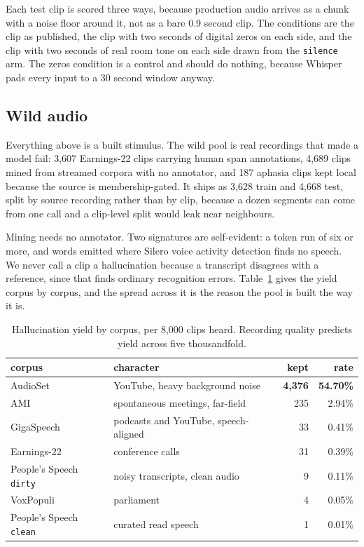 \documentclass[preprint]{article}
\begin{document}
Each test clip is scored three ways, because production audio arrives as a chunk with a noise
floor around it, not as a bare 0.9 second clip. The conditions are the clip as published, the
clip with two seconds of digital zeros on each side, and the clip with two seconds of real room
tone on each side drawn from the \texttt{silence} arm. The zeros condition is a control and
should do nothing, because Whisper pads every input to a 30 second window anyway.

\subsection{Wild audio}

Everything above is a built stimulus. The wild pool is real recordings that made a model fail:
3,607 Earnings-22 \citep{delrio2022earnings22} clips carrying human span annotations, 4,689
clips mined from streamed corpora with no annotator, and 187 aphasia clips kept local because
the source is membership-gated. It ships as 3,628 train and 4,668 test, split by source
recording rather than by clip, because a dozen segments can come from one call and a clip-level
split would leak near neighbours.

Mining needs no annotator. Two signatures are self-evident: a token run of six or more, and
words emitted where Silero voice activity detection finds no speech. We never call a clip a
hallucination because a transcript disagrees with a reference, since that finds ordinary
recognition errors. Table~\ref{tab:yield} gives the yield corpus by corpus, and the spread
across it is the reason the pool is built the way it is.

\begin{table}[!htbp]
\centering
\caption{Hallucination yield by corpus, per 8,000 clips heard. Recording quality predicts yield
across five thousandfold.}
\label{tab:yield}
\footnotesize
\begin{tabular}{llrr}
\toprule
\textbf{corpus} & \textbf{character} & \textbf{kept} & \textbf{rate} \\
\midrule
AudioSet \citep{gemmeke2017audioset} & YouTube, heavy background noise & \textbf{4{,}376} & \textbf{54.70\%} \\
AMI \citep{carletta2005ami} & spontaneous meetings, far-field & 235 & 2.94\% \\
GigaSpeech \citep{chen2021gigaspeech} & podcasts and YouTube, speech-aligned & 33 & 0.41\% \\
Earnings-22 \citep{delrio2022earnings22} & conference calls & 31 & 0.39\% \\
People's Speech \texttt{dirty} \citep{galvez2021peoplesspeech} & noisy transcripts, clean audio & 9 & 0.11\% \\
VoxPopuli \citep{wang2021voxpopuli} & parliament & 4 & 0.05\% \\
People's Speech \texttt{clean} & curated read speech & 1 & 0.01\% \\
\bottomrule
\end{tabular}
\end{table}
\end{document}
